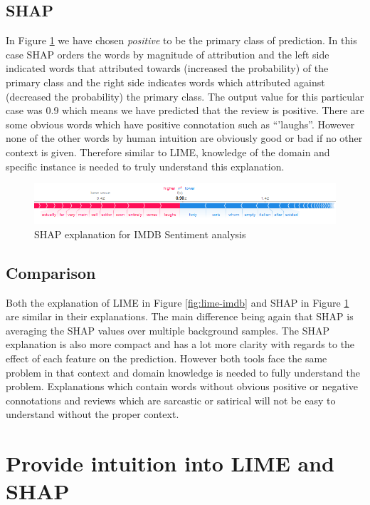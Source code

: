 \subsection{SHAP}
In Figure \ref{fig:shap-imdb} we have chosen \emph{positive} to be the primary class of prediction. In this case SHAP orders the words by magnitude of attribution and the left side indicated words that attributed towards (increased the probability) of the primary class and the right side indicates words which attributed against (decreased the probability) the primary class. The output value for this particular case was 0.9 which means we have predicted that the review is positive. There are some obvious words which have positive connotation such as ``'laughs''. However none of the other words by human intuition are obviously good or bad if no other context is given. Therefore similar to LIME, knowledge of the domain and specific instance is needed to truly understand this explanation.

\begin  {figure}[!htpb]
  \includegraphics[width=\linewidth]{Evaluation_Images/IMDB_explanation_1.png}
  \caption{SHAP explanation for IMDB Sentiment analysis}
  \label{fig:shap-imdb}
\end{figure}
\subsection{Comparison}
Both the explanation of LIME in Figure \ref{fig:lime-imdb} and SHAP in Figure \ref{fig:shap-imdb} are similar in their explanations. The main difference being again that SHAP is averaging the SHAP values over multiple background samples. The SHAP explanation is also more compact and has a lot more clarity with regards to the effect of each feature on the prediction. However both tools face the same problem in that context and domain knowledge is needed to fully understand the problem.  Explanations which contain words without obvious positive or negative connotations and reviews which are sarcastic or satirical will not be easy to understand without the proper context. 
\section{Provide intuition into LIME and SHAP}

